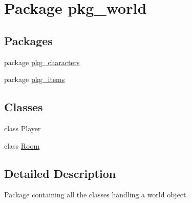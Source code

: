 \hypertarget{namespacepkg__world}{\section{Package pkg\-\_\-world}
\label{namespacepkg__world}
}
\subsection*{Packages}
\begin{DoxyCompactItemize}
\item 
package \hyperlink{namespacepkg__world_1_1pkg__characters}{pkg\-\_\-characters}
\item 
package \hyperlink{namespacepkg__world_1_1pkg__items}{pkg\-\_\-items}
\end{DoxyCompactItemize}
\subsection*{Classes}
\begin{DoxyCompactItemize}
\item 
class \hyperlink{classpkg__world_1_1Player}{Player}
\item 
class \hyperlink{classpkg__world_1_1Room}{Room}
\end{DoxyCompactItemize}


\subsection{Detailed Description}
Package containing all the classes handling a world object. 